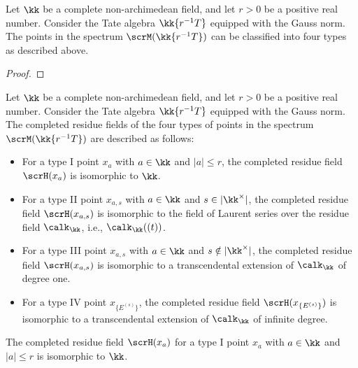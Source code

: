     \begin{proposition}\label{prop:four_types_of_points_in_spectrum_of_Tate_algebra_in_one_variable}
        Let \(\kk\) be a complete non-archimedean field, and let \(r > 0\) be a positive real number.
        Consider the Tate algebra \(\kk\{r^{-1}T\}\) equipped with the Gauss norm.
        The points in the spectrum \(\scrM(\kk\{r^{-1}T\})\) can be classified into four types as described above.
    \end{proposition}
    \begin{proof}
    \end{proof}

    \begin{proposition}\label{prop:the_complete_residue_field_of_all_four_types_points_in__spectrum_of_Tate_algebra_in_one_variable}
        Let \(\kk\) be a complete non-archimedean field, and let \(r > 0\) be a positive real number.
        Consider the Tate algebra \(\kk\{r^{-1}T\}\) equipped with the Gauss norm.
        The completed residue fields of the four types of points in the spectrum \(\scrM(\kk\{r^{-1}T\})\) are described as follows:
        \begin{itemize}
            \item For a type I point \(x_a\) with \(a \in \kk\) and \(|a| \leq r\), the completed residue field \(\scrH(x_a)\) is isomorphic to \(\kk\).
            \item For a type II point \(x_{a,s}\) with \(a \in \kk\) and \(s \in |\kk^\times|\), the completed residue field \(\scrH(x_{a,s})\) is isomorphic to the field of Laurent series over the residue field \(\calk_\kk\), i.e., \(\calk_\kk((t))\).
            \item For a type III point \(x_{a,s}\) with \(a \in \kk\) and \(s \notin |\kk^\times|\), the completed residue field \(\scrH(x_{a,s})\) is isomorphic to a transcendental extension of \(\calk_\kk\) of degree one.
            \item For a type IV point \(x_{\{E^{(s)}\}}\), the completed residue field \(\scrH(x_{\{E^{(s)}\}})\) is isomorphic to a transcendental extension of \(\calk_\kk\) of infinite degree.
        \end{itemize}
    \end{proposition}

    \begin{example}\label{eg:completed_residue_field_in_spectrum_of_Tate_algebra_in_one_variable_over_Q_p}
        The completed residue field \(\scrH(x_a)\) for a type I point \(x_a\) with \(a \in \kk\) and \(|a| \leq r\) is isomorphic to \(\kk\).
    \end{example}
